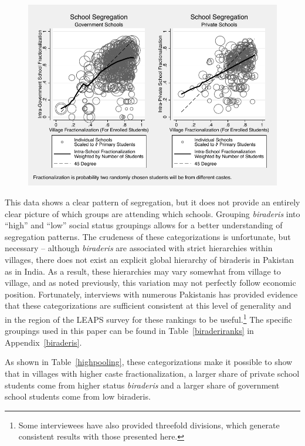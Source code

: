 \documentclass[12pt]{article}
\begin{document}
\begin{figure}[H]
	\begin{center}
	\caption{}\label{schoolvvillageherf}
	\includegraphics[scale=1.0]{graphs/intra_versus_intervillage_frac_combined.pdf}
	\end{center}
\end{figure}

This data shows a clear pattern of segregation, but it does not provide an entirely clear picture of which groups are attending which schools.  Grouping \emph{biraderis} into ``high'' and ``low'' social status groupings allows for a better understanding of segregation patterns. The crudeness of these categorizations is unfortunate, but necessary -- although \emph{biraderis} are associated with strict hierarchies within villages, there does not exist an explicit global hierarchy of biraderis in Pakistan as in India. As a result, these hierarchies may vary somewhat from village to village, and as noted previously, this variation may not perfectly follow economic position. Fortunately, interviews with numerous Pakistanis has provided evidence that these categorizations are sufficient consistent at this level of generality and in the region of the LEAPS survey for these rankings to be useful.\footnote{Some interviewees have also provided threefold divisions, which generate consistent results with those presented here.} The specific groupings used in this paper can be found in Table~\ref{biraderiranks} in Appendix~\ref{biraderis}.

As shown in Table~\ref{highpooling}, these categorizations make it possible to show that in villages with higher caste fractionalization, a larger share of private school students come from higher status \emph{biraderis} and a larger share of government school students come from low biraderis.
\end{document}
